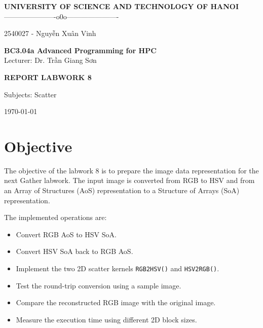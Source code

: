 \documentclass[11pt]{article}
\begin{document}
\begin{center}

{\Large \textbf{UNIVERSITY OF SCIENCE AND TECHNOLOGY OF HANOI}}\\
\vspace{0.3cm}
----------------------o0o----------------------\\

\vspace{4cm}

{\large
\centerline{2540027 - Nguyễn Xuân Vinh}
}

\vspace{4cm}

{\Huge \textbf{BC3.04a Advanced Programming for HPC}}\\
\vspace{0.5cm}
Lecturer: Dr. Trần Giang Sơn

\vspace{4cm}

{\Large \textbf{REPORT LABWORK 8}}\\

\vspace{0.5cm}

{\large
Subjects: Scatter
}

\vspace{4cm}
\today
\end{center}

\newpage

\newpage

\tableofcontents

\newpage

\section{Objective}

The objective of the labwork 8 is to prepare the image data representation for the next Gather labwork. The input image is converted from RGB to HSV and from an Array of Structures (AoS) representation to a Structure of Arrays (SoA) representation.

The implemented operations are:

\begin{itemize}
\item Convert RGB AoS to HSV SoA.
\item Convert HSV SoA back to RGB AoS.
\item Implement the two 2D scatter kernels \texttt{RGB2HSV()} and \texttt{HSV2RGB()}.
\item Test the round-trip conversion using a sample image.
\item Compare the reconstructed RGB image with the original image.
\item Measure the execution time using different 2D block sizes.
\end{itemize}
\end{document}
